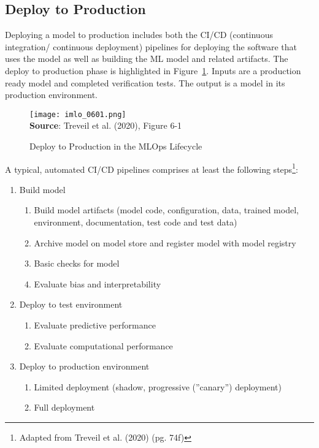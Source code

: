 \subsection{Deploy to Production}

Deploying a model to production includes both the CI/CD (continuous integration/ continuous deployment) pipelines for deploying the software that uses the model as well as building the ML model and related artifacts. The deploy to production phase is highlighted in Figure~\ref{fig:deploytoproduction}. Inputs are a production ready model and completed verification tests. The output is a model in its production environment. 

\begin{figure}[h]
\centering
\texttt{[image: imlo\_0601.png]} \\

\vspace{\baselineskip}
\scriptsize \textbf{Source}: Treveil et al. (2020), Figure 6-1
\caption{Deploy to Production in the MLOps Lifecycle}
\label{fig:deploytoproduction}
\end{figure}

A typical, automated CI/CD pipelines comprises at least the following steps\footnote{Adapted from Treveil et al. (2020) (pg. 74f)}:

\begin{enumerate}
\item Build model
\begin{enumerate}
   \item Build model artifacts (model code, configuration, data, trained model, environment, documentation, test code and test data)
   \item Archive model on model store and register model with model registry
   \item Basic checks for model
   \item Evaluate bias and interpretability 
\end{enumerate}
\item Deploy to test environment
\begin{enumerate}
    \item Evaluate predictive performance
    \item Evaluate computational performance
\end{enumerate}
\item Deploy to production environment
\begin{enumerate}
   \item Limited deployment (shadow, progressive (''canary'') deployment)
   \item Full deployment
\end{enumerate}
\end{enumerate} 

